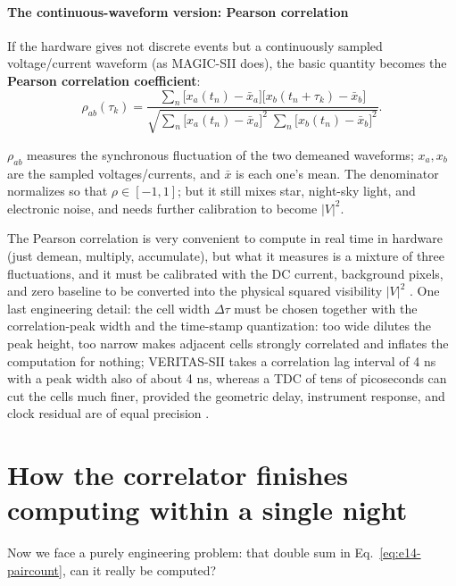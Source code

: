 \paragraph{The continuous-waveform version: Pearson correlation}

If the hardware gives not discrete events but a continuously sampled voltage/current waveform (as MAGIC-SII does), the basic quantity becomes the \textbf{Pearson correlation coefficient}:
\begin{equation}
  \rho_{ab}(\tau_k)
  =\frac{\sum_n\big[x_a(t_n)-\bar x_a\big]\big[x_b(t_n+\tau_k)-\bar x_b\big]}
        {\sqrt{\sum_n\big[x_a(t_n)-\bar x_a\big]^2\;\sum_n\big[x_b(t_n)-\bar x_b\big]^2}} .
  \label{eq:e14-pearson}
\end{equation}
\begin{formulaexplain}
$\rho_{ab}$ measures the synchronous fluctuation of the two demeaned waveforms; $x_a,x_b$ are the sampled voltages/currents, and $\bar x$ is each one's mean. The denominator normalizes so that $\rho\in[-1,1]$; but it still mixes star, night-sky light, and electronic noise, and needs further calibration to become $|V|^2$.
\end{formulaexplain}
The Pearson correlation is very convenient to compute in real time in hardware (just demean, multiply, accumulate), but what it measures is a mixture of three fluctuations, and it must be calibrated with the DC current, background pixels, and zero baseline to be converted into the physical squared visibility $|V|^2$ \citep{2024MNRAS.529.4387A}. One last engineering detail: the cell width $\Delta\tau$ must be chosen together with the correlation-peak width and the time-stamp quantization: too wide dilutes the peak height, too narrow makes adjacent cells strongly correlated and inflates the computation for nothing; VERITAS-SII takes a correlation lag interval of 4 ns with a peak width also of about 4 ns, whereas a TDC of tens of picoseconds can cut the cells much finer, provided the geometric delay, instrument response, and clock residual are of equal precision \citep{2020NatAs...4.1164A,2020RScI...91a3108W,2009A&A...508..531N}.

\section{How the correlator finishes computing within a single night}
\label{sec:e14-scaling}

Now we face a purely engineering problem: that double sum in Eq.~\eqref{eq:e14-paircount}, can it really be computed?

